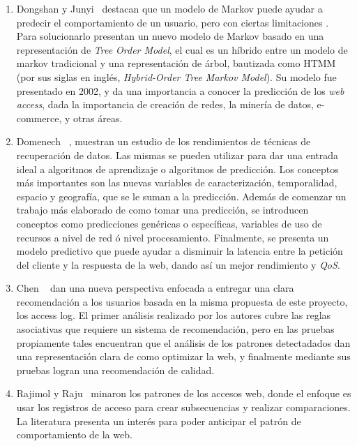\begin{enumerate}
  \item Dongshan y Junyi~\cite{Dongshan2002} destacan que un modelo de Markov puede ayudar a predecir el comportamiento de un usuario, pero con ciertas limitaciones .  Para solucionarlo presentan un nuevo modelo de Markov basado en una representación de \emph{Tree Order Model}, el cual es un híbrido entre un modelo de markov tradicional y una representación de árbol, bautizada como HTMM (por sus siglas en inglés, \emph{Hybrid-Order Tree Markov Model}).
  Su modelo fue presentado en 2002, y da una importancia a conocer la predicción de los \emph{web access}, dada la importancia de creación de redes, la minería de datos, e-commerce, y otras áreas.

  \item Domenech \etal~\cite{Domenech2006}, muestran un estudio de los rendimientos de técnicas de recuperación de datos.
  Las mismas se pueden utilizar para dar una entrada ideal a algoritmos de aprendizaje o algoritmos de predicción. 
  Los conceptos más importantes son las nuevas variables de caracterización, temporalidad, espacio y geografía, que se le suman a la predicción. 
  Además de comenzar un trabajo más elaborado de como tomar una predicción, se introducen conceptos como predicciones genéricas o específicas, variables de uso de recursos a nivel de red ó nivel procesamiento.
  Finalmente, se presenta un modelo predictivo que puede ayudar a disminuir la latencia entre la petición del cliente y la respuesta de la web, dando así un mejor rendimiento y \emph{QoS}.



  \item Chen \etal~\cite{Chen2011} dan una nueva perspectiva enfocada a entregar una clara recomendación a los usuarios basada en la misma propuesta de este proyecto, los access log.
  El primer análisis realizado por los autores cubre las reglas asociativas que requiere un sistema de recomendación, pero en las pruebas propiamente tales encuentran que el análisis de los patrones detectadados dan una representación clara de como optimizar la web, y finalmente mediante sus pruebas logran una recomendación de calidad.

  \item Rajimol y Raju~\cite{Rajimol2012} minaron los patrones de los accesos web, donde el enfoque es usar los registros de acceso para crear subsecuencias y realizar comparaciones.
  La literatura presenta un interés para poder anticipar el patrón de comportamiento de la web.


\end{enumerate}
